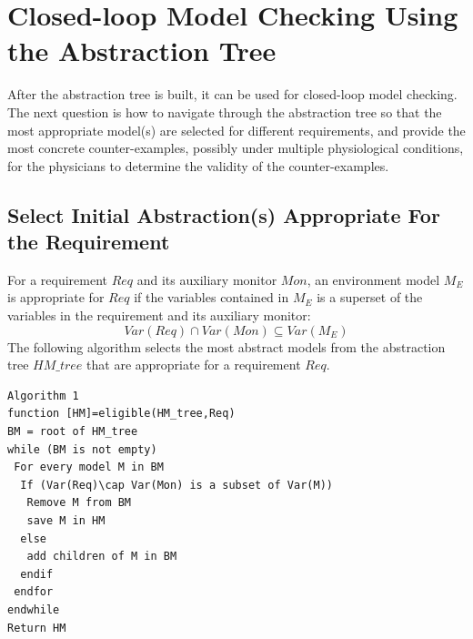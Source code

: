 \section{Closed-loop Model Checking Using the Abstraction Tree}
After the abstraction tree is built, it can be used for closed-loop model checking. The next question is how to navigate through the abstraction tree so that the most appropriate model(s) are selected for different requirements, and provide the most concrete counter-examples, possibly under multiple physiological conditions, for the physicians to determine the validity of the counter-examples. %
\subsection{Select Initial Abstraction(s) Appropriate For the Requirement}
For a requirement $Req$ and its auxiliary monitor $Mon$, an environment model $M_E$ is appropriate for $Req$ if the variables contained in $M_E$ is a superset of the variables in the requirement and its auxiliary monitor: 
$$Var(Req)\cap Var(Mon)\subseteq Var(M_E)$$
The following algorithm selects the most abstract models from the abstraction tree $HM\_tree$ that are appropriate for a requirement $Req$.
\begin{Verbatim}
Algorithm 1
function [HM]=eligible(HM_tree,Req)
BM = root of HM_tree
while (BM is not empty)
 For every model M in BM
  If (Var(Req)\cap Var(Mon) is a subset of Var(M))
   Remove M from BM
   save M in HM
  else
   add children of M in BM
  endif
 endfor
endwhile
Return HM
\end{Verbatim}
